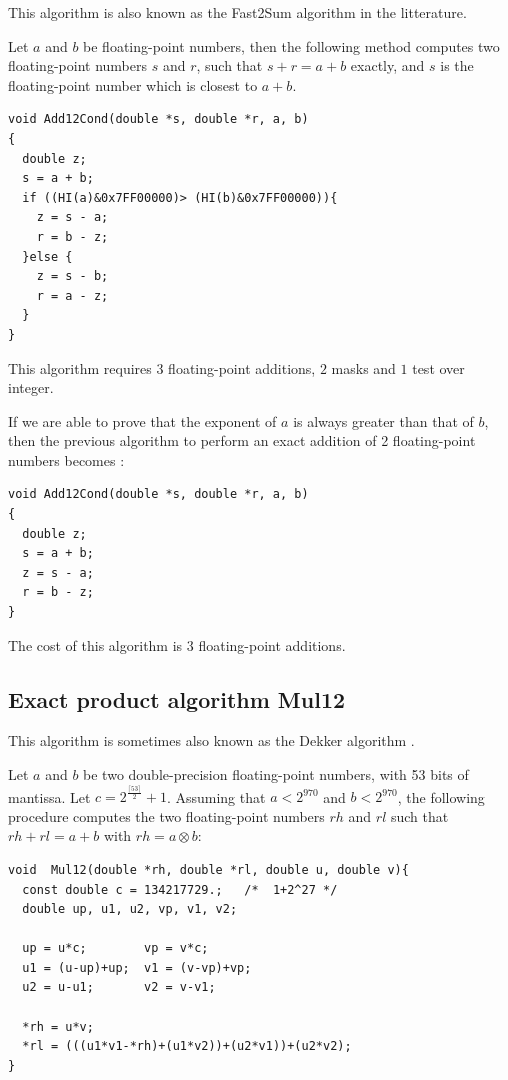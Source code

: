 This algorithm is also known as the Fast2Sum algorithm in the litterature.
\begin{theorem}
  Let $a$ and $b$ be floating-point numbers, then the following method
  computes two floating-point numbers $s$ and $r$, such that $s+r =
  a+b$ exactly, and $s$ is the floating-point number which is closest
  to $a+b$.

\begin{lstlisting}[label={lst:Add12Cond},caption={Add12Cond},firstnumber=1]
void Add12Cond(double *s, double *r, a, b) 
{
  double z;
  s = a + b;            
  if ((HI(a)&0x7FF00000)> (HI(b)&0x7FF00000)){  
    z = s - a;           
    r = b - z;           
  }else {                 
    z = s - b;           
    r = a - z;           
  } 
}                         
\end{lstlisting}
This algorithm requires $3$ floating-point additions, $2$ masks and $1$ test over integer.
\end{theorem}


If we are able to prove that  the exponent of $a$ is always greater than that
of $b$, then the previous algorithm to perform an exact addition of 2
floating-point numbers becomes :
\begin{lstlisting}[label={lst:Add12},caption={Add12},firstnumber=1]
void Add12Cond(double *s, double *r, a, b) 
{
  double z;
  s = a + b;            
  z = s - a;  
  r = b - z; 
}            
\end{lstlisting}
The cost of this algorithm is $3$ floating-point additions.






\subsection{Exact product algorithm {Mul12}}

This algorithm is sometimes  also known as the Dekker algorithm \cite{Dek71,Knu73}.

\begin{theorem}
  Let $a$ and $b$ be two double-precision floating-point numbers, with
  53 bits of mantissa. Let $c=2^{\frac{\lceil 53 \rceil}{2}}+1$.
  Assuming that $a<2^{970}$ and $b<2^{970}$, the following procedure
  computes the two floating-point numbers $rh$ and $rl$ such that $rh
  + rl = a + b$ with $rh = a \otimes b$:
\begin{lstlisting}[label={lst:Mul12},caption={Mul12},firstnumber=1]
void  Mul12(double *rh, double *rl, double u, double v){
  const double c = 134217729.;   /*  1+2^27 */ 
  double up, u1, u2, vp, v1, v2;

  up = u*c;        vp = v*c;
  u1 = (u-up)+up;  v1 = (v-vp)+vp;
  u2 = u-u1;       v2 = v-v1;
  
  *rh = u*v;
  *rl = (((u1*v1-*rh)+(u1*v2))+(u2*v1))+(u2*v2);
}
\end{lstlisting}
\end{theorem}

